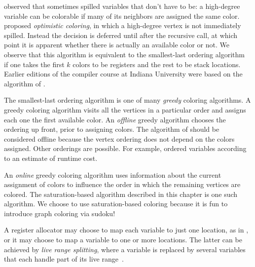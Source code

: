 \documentclass[7x10]{TimesAPriori_MIT}%
\numberwithin{theorem}{chapter}
\numberwithin{definition}{chapter}
\numberwithin{equation}{chapter}
\begin{document}
\citet{Briggs:1994kx} observed that \citet{Chaitin:1982vn} sometimes
spilled variables that don't have to be: a high-degree variable can be
colorable if many of its neighbors are assigned the same color.
\citet{Briggs:1994kx} proposed \emph{optimistic coloring}, in which a
high-degree vertex is not immediately spilled. Instead the decision is
deferred until after the recursive call, at which point it is apparent
whether there is actually an available color or not. We observe that
this algorithm is equivalent to the smallest-last ordering
algorithm~\citep{Matula:1972aa} if one takes the first $k$ colors to
be registers and the rest to be stack locations.
Earlier editions of the compiler course at Indiana University
\citep{Dybvig:2010aa} were based on the algorithm of
\citet{Briggs:1994kx}.

The smallest-last ordering algorithm is one of many \emph{greedy}
coloring algorithms. A greedy coloring algorithm visits all the
vertices in a particular order and assigns each one the first
available color. An \emph{offline} greedy algorithm chooses the
ordering up front, prior to assigning colors. The algorithm of
\citet{Chaitin:1981vl} should be considered offline because the vertex
ordering does not depend on the colors assigned.  Other orderings are
possible. For example, \citet{Chow:1984ys} ordered variables according
to an estimate of runtime cost.

An \emph{online} greedy coloring algorithm uses information about the
current assignment of colors to influence the order in which the
remaining vertices are colored. The saturation-based algorithm
described in this chapter is one such algorithm. We choose to use
saturation-based coloring because it is fun to introduce graph
coloring via sudoku!

A register allocator may choose to map each variable to just one
location, as in \citet{Chaitin:1981vl}, or it may choose to map a
variable to one or more locations. The latter can be achieved by
\emph{live range splitting}, where a variable is replaced by several
variables that each handle part of its live
range~\citep{Chow:1984ys,Briggs:1994kx,Cooper:1998ly}.



\end{document}
